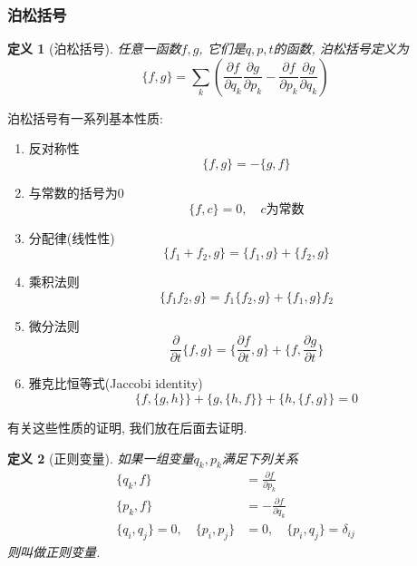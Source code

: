 \documentclass[a4paper,11pt]{article}
\newtheorem{definition}{\hspace{2em}定义}[section]
\begin{document}
\subsubsection{泊松括号}
\begin{definition}[泊松括号]
  任意一函数$f,g$, 它们是$q,p,t$的函数, 泊松括号定义为
  \begin{equation}\label{Poisson bracket}
    \{f,g\}=\sum_{k}\left(\frac{\partial f}{\partial{q_k}}\frac{\partial g}{\partial{p_k}}-\frac{\partial f}{\partial{p_k}}\frac{\partial g}{\partial{q_k}}\right)
  \end{equation}
\end{definition}
泊松括号有一系列基本性质:
\begin{enumerate}[(1)]
  \item\label{poisson 1} 反对称性
  \begin{equation*}
    \{f,g\}=-\{g,f\}
  \end{equation*}
  \item\label{poisson 2} 与常数的括号为$0$
  \begin{equation*}
    \{f,c\}=0,\quad\text{$c$为常数}
  \end{equation*}
  \item\label{poisson 3} 分配律(线性性)
  \begin{equation*}
    \{f_1+f_2,g\}=\{f_1,g\}+\{f_2,g\}
  \end{equation*}
  \item\label{poisson 4} 乘积法则
  \begin{equation*}
    \{f_1f_2,g\}=f_1\{f_2,g\}+\{f_1,g\}f_2
  \end{equation*}
  \item\label{poisson 5} 微分法则
  \begin{equation*}
    \frac{\partial}{\partial t}\{f,g\}=\{\frac{\partial f}{\partial t},g\}+\{f,\frac{\partial g}{\partial t}\}
  \end{equation*}
  \item\label{poisson 6} 雅克比恒等式(Jaccobi identity)
  \begin{equation*}
    \{f,\{g,h\}\}+\{g,\{h,f\}\}+\{h,\{f,g\}\}=0
  \end{equation*}
\end{enumerate}
有关这些性质的证明, 我们放在后面去证明.
\begin{definition}[正则变量]
  如果一组变量$q_k,p_k$满足下列关系
  \begin{equation*}
    \begin{split}
       \{q_k,f\} & =\frac{\partial f}{\partial{p_k}} \\
       \{p_k,f\} & =-\frac{\partial f}{\partial{q_k}} \\
       \{q_i,q_j\}=0,\quad \{p_i,p_j\}&=0,\quad \{p_i,q_j\}=\delta_{ij}
    \end{split}
  \end{equation*}
  则叫做正则变量.
\end{definition}
\end{document}
